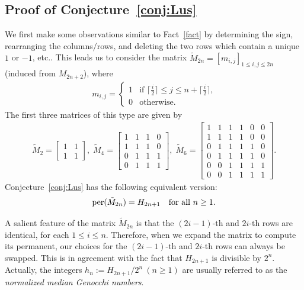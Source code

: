 \documentclass[11pt,reqno]{amsart}
\numberwithin{equation}{section}
\theoremstyle{plain}
\theoremstyle{definition}
\def\per{\mathrm{per}}
\def\per{{\rm per}}
\begin{document}
\subsection{Proof of Conjecture~\ref{conj:Lus}}
 We first make some observations similar to Fact~\ref{fact} by determining the sign, rearranging the columns$\slash$rows, and deleting the two rows which contain a unique $1$ or $-1$, etc.. This leads us to consider the matrix $\tilde{M}_{2n}=[m_{i,j}]_{1\le i,j\le 2n}$ (induced from $M_{2n+2}$), where
\begin{align*}
m_{i,j}=\begin{cases}
1 & \text{if $\lceil\frac{i}{2}\rceil\le j\le n+\lceil\frac{i}{2}\rceil$,}\\
0 & \text{otherwise.}
\end{cases}
\end{align*}
The first three matrices of this type are given by
\begin{align*}
\tilde{M}_2=\begin{bmatrix}
1 & 1 \\
1 & 1
\end{bmatrix},
\;
\tilde{M}_4=\begin{bmatrix}
1 & 1 & 1 & 0\\
1 & 1 & 1 & 0\\
0 & 1 & 1 & 1\\
0 & 1 & 1 & 1
\end{bmatrix},
\;
\tilde{M}_6=\begin{bmatrix}
1 & 1 & 1 & 1 & 0 & 0\\
1 & 1 & 1 & 1 & 0 & 0\\
0 & 1 & 1 & 1 & 1 & 0\\
0 & 1 & 1 & 1 & 1 & 0\\
0 & 0 & 1 & 1 & 1 & 1\\
0 & 0 & 1 & 1 & 1 & 1
\end{bmatrix}.
\end{align*}
Conjecture~\ref{conj:Lus} has the following equivalent version:
\begin{align}
\per(\tilde{M}_{2n})=H_{2n+1}\ \ \text{ for all } n\ge 1.
\end{align}

A salient feature of the matrix $\tilde{M}_{2n}$ is that the $(2i-1)$-th and $2i$-th rows are identical, for each $1\le i\le n$. Therefore, when we expand the matrix to compute its permanent, our choices for the $(2i-1)$-th and $2i$-th rows can always be swapped. This is in agreement with the fact that $H_{2n+1}$ is divisible by $2^n$. Actually, the integers $h_n:=H_{2n+1}/2^n\ (n\ge1)$ are usually referred to as the {\it normalized median Genocchi numbers}.
\end{document}
